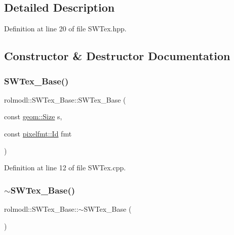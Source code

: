 \subsection{Detailed Description}


Definition at line 20 of file S\+W\+Tex.\+hpp.



\subsection{Constructor \& Destructor Documentation}
\mbox{\label{classrolmodl_1_1_s_w_tex___base_a5143f1794e13d2fd117536ac8e731268}} 
\subsubsection{\texorpdfstring{SWTex\_Base()}{SWTex\_Base()}\hspace{0.1cm}{\footnotesize\ttfamily [1/4]}}
{\footnotesize\ttfamily rolmodl\+::\+S\+W\+Tex\+\_\+\+Base\+::\+S\+W\+Tex\+\_\+\+Base (\begin{DoxyParamCaption}\item[{const \mbox{\hyperlink{structrolmodl_1_1geom_1_1_size}{geom\+::\+Size}}}]{s,  }\item[{const \mbox{\hyperlink{namespacerolmodl_1_1pixelfmt_a96282713e4465ba9211c8fd3a702b52b}{pixelfmt\+::\+Id}}}]{fmt }\end{DoxyParamCaption})}



Definition at line 12 of file S\+W\+Tex.\+cpp.

\mbox{\label{classrolmodl_1_1_s_w_tex___base_afd822a8f9134dddfa9e17e8a57734460}} 
\subsubsection{\texorpdfstring{$\sim$SWTex\_Base()}{~SWTex\_Base()}}
{\footnotesize\ttfamily rolmodl\+::\+S\+W\+Tex\+\_\+\+Base\+::$\sim$\+S\+W\+Tex\+\_\+\+Base (\begin{DoxyParamCaption}{ }\end{DoxyParamCaption})\hspace{0.3cm}{\ttfamily [noexcept]}}



